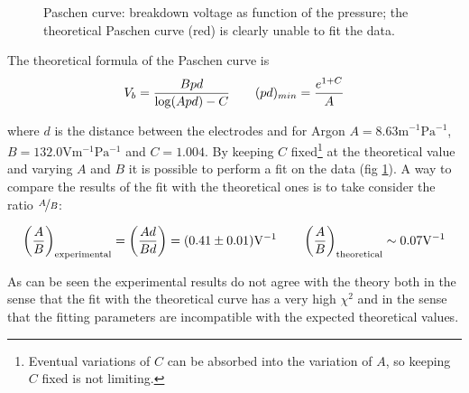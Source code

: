 \documentclass[11pt,a4 paper]{article}
\let\oldfrac\frac
\renewcommand{\frac}[3][d]{\ifthenelse{\equal{#1}{d}}{\oldfrac{#2}{#3}}{\nicefrac{#2}{#3}}}
\begin{document}
\begin{figure}[H]
  \centering
  \caption{Paschen curve: breakdown voltage as function of the pressure; the theoretical Paschen curve (red) is clearly unable to fit the data.}
  \label{fig:DCP}
\end{figure}

The theoretical formula of the Paschen curve is
\begin{gather} \label{eq:paschen}
  V_b = \frac{Bpd}{\log(Apd) - C} \qquad (pd)_{min} = \frac{e^{1+C}}{A}
\end{gather}

where $d$ is the distance between the electrodes and for Argon $A = 8.63 \si{\metre^{-1}\pascal^{-1}}$, $B = 132.0 \si{\volt\metre^{-1}\pascal^{-1}}$ and $C = 1.004$. By keeping $C$ fixed\footnote{Eventual variations of $C$ can be absorbed into the variation of $A$, so keeping $C$ fixed is not limiting.} at the theoretical value and varying $A$ and $B$ it is possible to perform a fit on the data (fig \ref{fig:DCP}).
A way to compare the results of the fit with the theoretical ones is to take consider the ratio $\frac[f]{A}{B}$:

\begin{gather*}
  \left( \frac{A}{B} \right)_{\text{experimental}} = \left( \frac{Ad}{Bd} \right) = (0.41 \pm 0.01) \si{\volt^{-1}} \qquad
  \left( \frac{A}{B} \right)_{\text{theoretical}} \sim 0.07 \si{\volt^{-1}}
\end{gather*}

As can be seen the experimental results do not agree with the theory both in the sense that the fit with the theoretical curve has a very high $\chi^2$ and in the sense that the fitting parameters are incompatible with the expected theoretical values.

\end{document}
